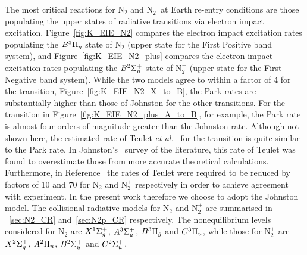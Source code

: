 {The most critical reactions for N$_2$ and N$_2^+$ at Earth re-entry conditions are those populating the upper states of radiative transitions via electron impact excitation.
Figure~\ref{fig:K_EIE_N2} compares the electron impact excitation rates populating the $B^3 \Pi_g$ state of N$_2$ (upper state for the First Positive band system), and Figure~\ref{fig:K_EIE_N2_plus} compares the electron impact excitation rates populating the $B^2 \Sigma_u^+$ state of N$_2^+$ (upper state for the First Negative band system).
While the two models agree to within a factor of 4 for the  transition, Figure~\ref{fig:K_EIE_N2_X_to_B}, the Park rates are substantially higher than those of Johnston for the other transitions.
For the  transition in Figure~\ref{fig:K_EIE_N2_plus_A_to_B}, for example, the Park rate is almost four orders of magnitude greater than the Johnston rate.
Although not shown here, the estimated rate of Teulet \textit{et al.}~\cite{TSG1999} for the  transition is quite similar to the Park rate.
In Johnston's~\cite{JohnPhd} survey of the literature, this rate of Teulet was found to overestimate those from more accurate theoretical calculations.
Furthermore, in Reference~\cite{CJ_EAST_2008} the rates of Teulet were required to be reduced by factors of 10 and 70 for N$_2$ and N$_2^+$ respectively in order to achieve agreement with experiment.
In the present work therefore we choose to adopt the Johnston~\cite{JohnPhd} model.
The collisional-radiative models for N$_2$ and N$_2^+$ are summarised in \textsection~\ref{sec:N2_CR} and~\ref{sec:N2p_CR} respectively.
The nonequilibrium levels considered for N$_2$ are $X^1 \Sigma_g^+$, $A^3 \Sigma_u^+$, $B^3 \Pi_g$ and $C^3 \Pi_u$, while those for N$_2^+$ are $X^2 \Sigma_g^+$, $A^2 \Pi_u$, $B^2 \Sigma_u^+$ and $C^2 \Sigma_u^+$.

}
